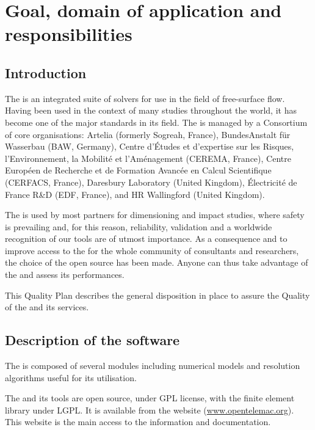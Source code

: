 \chapter{Goal, domain of application and responsibilities}

\section{Introduction}

The \telemacsystem{} is an integrated suite of solvers for use in the field of
free-surface flow. Having been used in the context of many studies throughout
the world, it has become one of the major standards in its field.
The \telemacsystem{} is managed by a Consortium of core organisations: Artelia
(formerly Sogreah, France), BundesAnstalt für Wasserbau (BAW, Germany), Centre
d’Études et d'expertise sur les Risques, l'Environnement, la Mobilité et
l'Aménagement (CEREMA, France), Centre Européen de Recherche et de Formation
Avancée en Calcul Scientifique (CERFACS, France), Daresbury Laboratory (United
Kingdom), Électricité de France R\&D (EDF, France), and HR Wallingford (United
Kingdom).

The \telemacsystem{} is used by most partners for dimensioning and impact
studies, where safety is prevailing and, for this reason, reliability,
validation and a worldwide recognition of our tools are of utmost importance.
As a consequence and to improve access to the \telemacsystem{} for the whole
community of consultants and researchers, the choice of the open source has
been made. Anyone can thus take advantage of the \telemacsystem{} and assess
its performances.

This Quality Plan describes the general disposition in place to assure the
Quality of the \telemacsystem{} and its services.

\section{Description of the software}

The \telemacsystem{} is composed of several modules including numerical models
and resolution algorithms useful for its utilisation.

The \telemacsystem{} and its tools are open source, under GPL license, with the
\bief{} finite element library under LGPL\@. It is available from the
\telemacsystem{} website (\url{www.opentelemac.org}). This website is the main
access to the \telemacsystem{} information and documentation.


